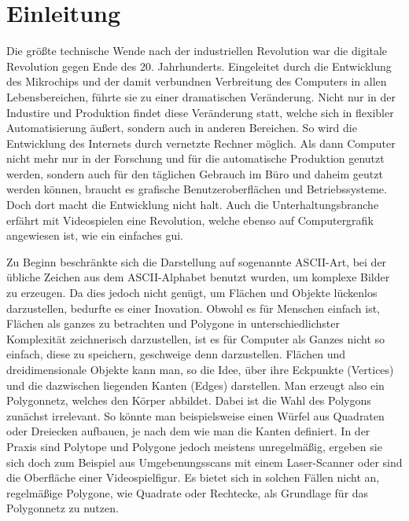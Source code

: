 \section{Einleitung}

Die größte technische Wende nach der industriellen Revolution war die digitale Revolution gegen Ende des 20. Jahrhunderts.\cite{digrev}
Eingeleitet durch die Entwicklung des Mikrochips und der damit verbundnen Verbreitung des Computers in allen Lebensbereichen, führte sie 
zu einer dramatischen Veränderung. Nicht nur in der Industire und Produktion findet diese Veränderung statt, welche sich in flexibler Automatisierung äußert,
sondern auch in anderen Bereichen. So wird die Entwicklung des Internets durch vernetzte Rechner möglich.
Als dann Computer nicht mehr nur in der Forschung und für die automatische Produktion genutzt werden, sondern auch für den täglichen Gebrauch im Büro und 
daheim geutzt werden können, braucht es grafische Benutzeroberflächen und Betriebssysteme. Doch dort macht die Entwicklung nicht halt.
Auch die Unterhaltungsbranche erfährt mit Videospielen eine Revolution, welche ebenso auf Computergrafik angewiesen ist, wie ein einfaches \ac{gui}.

Zu Beginn beschränkte sich die Darstellung auf sogenannte ASCII-Art, bei der übliche Zeichen aus dem ASCII-Alphabet benutzt wurden, um komplexe Bilder zu erzeugen.
Da dies jedoch nicht genügt, um Flächen und Objekte lückenlos darzustellen, bedurfte es einer Inovation. Obwohl es für Menschen einfach ist, Flächen als ganzes zu betrachten und
Polygone in unterschiedlichster Komplexität zeichnerisch darzustellen, ist es für Computer als Ganzes nicht so einfach, diese zu speichern, geschweige denn darzustellen.
Flächen und dreidimensionale Objekte kann man, so die Idee, über ihre Eckpunkte (Vertices) und die dazwischen liegenden Kanten (Edges) darstellen. 
Man erzeugt also ein Polygonnetz, welches den Körper abbildet. Dabei ist die Wahl des Polygons zunächst irrelevant. So könnte man 
beispielsweise einen Würfel aus Quadraten oder Dreiecken aufbauen, je nach dem wie man die Kanten definiert.\cite{polynet}
In der Praxis sind Polytope und Polygone jedoch meistens unregelmäßig, ergeben sie sich doch zum Beispiel aus Umgebenungsscans mit einem Laser-Scanner oder sind die Oberfläche einer Videospielfigur.
Es bietet sich in solchen Fällen nicht an, regelmäßige Polygone, wie Quadrate oder Rechtecke, als Grundlage für das Polygonnetz zu nutzen.

